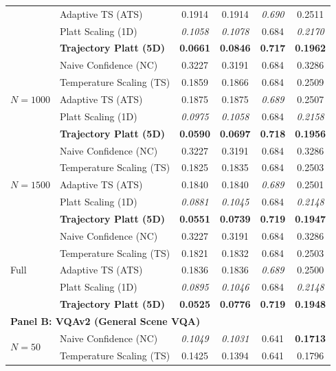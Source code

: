 \begin{table}[t]
\begin{tabular}{llcccc}
 & Adaptive TS (ATS) & 0.1914 & 0.1914 & \textit{0.690} & 0.2511 \\
 & Platt Scaling (1D) & \textit{0.1058} & \textit{0.1078} & 0.684 & \textit{0.2170} \\
 & \textbf{Trajectory Platt (5D)} & \textbf{0.0661} & \textbf{0.0846} & \textbf{0.717} & \textbf{0.1962} \\
\midrule
\multirow{5}{*}{$N = 1000$} & Naive Confidence (NC) & 0.3227 & 0.3191 & 0.684 & 0.3286 \\
 & Temperature Scaling (TS) & 0.1859 & 0.1866 & 0.684 & 0.2509 \\
 & Adaptive TS (ATS) & 0.1875 & 0.1875 & \textit{0.689} & 0.2507 \\
 & Platt Scaling (1D) & \textit{0.0975} & \textit{0.1058} & 0.684 & \textit{0.2158} \\
 & \textbf{Trajectory Platt (5D)} & \textbf{0.0590} & \textbf{0.0697} & \textbf{0.718} & \textbf{0.1956} \\
\midrule
\multirow{5}{*}{$N = 1500$} & Naive Confidence (NC) & 0.3227 & 0.3191 & 0.684 & 0.3286 \\
 & Temperature Scaling (TS) & 0.1825 & 0.1835 & 0.684 & 0.2503 \\
 & Adaptive TS (ATS) & 0.1840 & 0.1840 & \textit{0.689} & 0.2501 \\
 & Platt Scaling (1D) & \textit{0.0881} & \textit{0.1045} & 0.684 & \textit{0.2148} \\
 & \textbf{Trajectory Platt (5D)} & \textbf{0.0551} & \textbf{0.0739} & \textbf{0.719} & \textbf{0.1947} \\
\midrule
\multirow{5}{*}{Full} & Naive Confidence (NC) & 0.3227 & 0.3191 & 0.684 & 0.3286 \\
 & Temperature Scaling (TS) & 0.1821 & 0.1832 & 0.684 & 0.2503 \\
 & Adaptive TS (ATS) & 0.1836 & 0.1836 & \textit{0.689} & 0.2500 \\
 & Platt Scaling (1D) & \textit{0.0895} & \textit{0.1046} & 0.684 & \textit{0.2148} \\
 & \textbf{Trajectory Platt (5D)} & \textbf{0.0525} & \textbf{0.0776} & \textbf{0.719} & \textbf{0.1948} \\
\midrule
\multicolumn{6}{l}{\textbf{Panel B: VQAv2 (General Scene VQA)}} \\
\midrule
\multirow{5}{*}{$N = 50$} & Naive Confidence (NC) & \textit{0.1049} & \textit{0.1031} & 0.641 & \textbf{0.1713} \\
 & Temperature Scaling (TS) & 0.1425 & 0.1394 & 0.641 & 0.1796 \\

\end{tabular}
\end{table}

